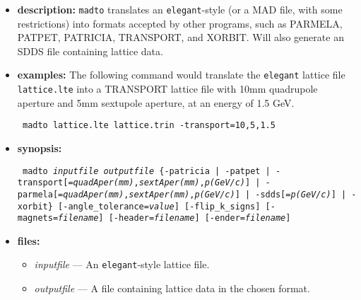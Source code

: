 \documentclass[11pt]{article}
\begin{document}
\begin{itemize}
\item {\bf description:} 
\verb|madto| translates an {\tt elegant}-style (or a MAD file, with
some restrictions) into formats accepted by other programs, such as
PARMELA, PATPET, PATRICIA, TRANSPORT, and XORBIT.  Will also generate
an SDDS file containing lattice data.

\item {\bf examples:}
The following command would translate the {\tt elegant} lattice file 
\verb|lattice.lte| into a TRANSPORT lattice file with 10mm quadrupole
aperture and 5mm sextupole aperture, at an energy of 1.5 GeV.
\begin{flushleft}{\tt
madto lattice.lte lattice.trin -transport=10,5,1.5
}\end{flushleft}

\item {\bf synopsis:}
\begin{flushleft}{\tt
madto {\em inputfile} {\em outputfile}
 \{-patricia | -patpet | -transport[={\em quadAper(mm)},{\em sextAper(mm)},{\em p(GeV/c)}]
            | -parmela[={\em quadAper(mm)},{\em sextAper(mm)},{\em p(GeV/c)}]
            | -sdds[={\em p(GeV/c)}] | -xorbit\}
 [-angle\_tolerance={\em value}] [-flip\_k\_signs] [-magnets={\em filename}]
 [-header={\em filename}] [-ender={\em filename}]
}\end{flushleft}

\item {\bf files:}
\begin{itemize}
\item {\em inputfile} --- An {\tt elegant}-style lattice file.
\item {\em outputfile} --- A file containing lattice data in the chosen format.
\end{itemize}


\end{itemize}
\end{document}
